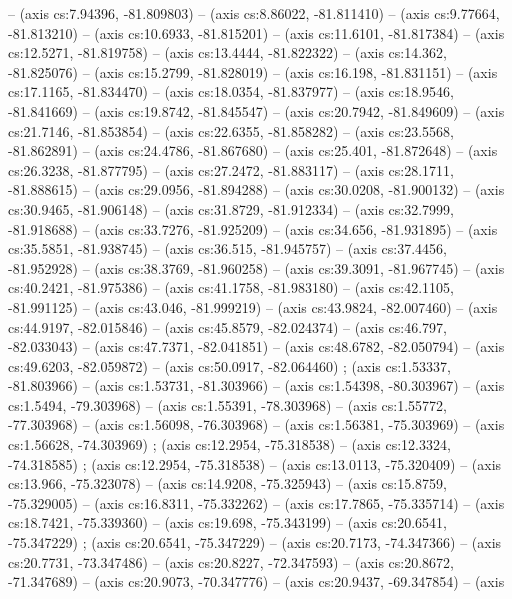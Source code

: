   -- (axis cs:7.94396, -81.809803) -- (axis cs:8.86022, -81.811410) -- (axis
  cs:9.77664, -81.813210) -- (axis cs:10.6933, -81.815201) -- (axis
  cs:11.6101, -81.817384) -- (axis cs:12.5271, -81.819758) -- (axis
  cs:13.4444, -81.822322) -- (axis cs:14.362, -81.825076) -- (axis cs:15.2799,
  -81.828019) -- (axis cs:16.198, -81.831151) -- (axis cs:17.1165, -81.834470)
  -- (axis cs:18.0354, -81.837977) -- (axis cs:18.9546, -81.841669) -- (axis
  cs:19.8742, -81.845547) -- (axis cs:20.7942, -81.849609) -- (axis
  cs:21.7146, -81.853854) -- (axis cs:22.6355, -81.858282) -- (axis
  cs:23.5568, -81.862891) -- (axis cs:24.4786, -81.867680) -- (axis cs:25.401,
  -81.872648) -- (axis cs:26.3238, -81.877795) -- (axis cs:27.2472,
  -81.883117) -- (axis cs:28.1711, -81.888615) -- (axis cs:29.0956,
  -81.894288) -- (axis cs:30.0208, -81.900132) -- (axis cs:30.9465,
  -81.906148) -- (axis cs:31.8729, -81.912334) -- (axis cs:32.7999,
  -81.918688) -- (axis cs:33.7276, -81.925209) -- (axis cs:34.656, -81.931895)
  -- (axis cs:35.5851, -81.938745) -- (axis cs:36.515, -81.945757) -- (axis
  cs:37.4456, -81.952928) -- (axis cs:38.3769, -81.960258) -- (axis
  cs:39.3091, -81.967745) -- (axis cs:40.2421, -81.975386) -- (axis
  cs:41.1758, -81.983180) -- (axis cs:42.1105, -81.991125) -- (axis cs:43.046,
  -81.999219) -- (axis cs:43.9824, -82.007460) -- (axis cs:44.9197,
  -82.015846) -- (axis cs:45.8579, -82.024374) -- (axis cs:46.797, -82.033043)
  -- (axis cs:47.7371, -82.041851) -- (axis cs:48.6782, -82.050794) -- (axis
  cs:49.6203, -82.059872) -- (axis cs:50.0917, -82.064460)
  ;  (axis cs:1.53337, -81.803966) -- (axis
  cs:1.53731, -81.303966) -- (axis cs:1.54398, -80.303967) -- (axis cs:1.5494,
  -79.303968) -- (axis cs:1.55391, -78.303968) -- (axis cs:1.55772,
  -77.303968) -- (axis cs:1.56098, -76.303968) -- (axis cs:1.56381,
  -75.303969) -- (axis cs:1.56628, -74.303969) ; 
  (axis cs:12.2954, -75.318538) -- (axis cs:12.3324, -74.318585)
  ;  (axis cs:12.2954, -75.318538) -- (axis
  cs:13.0113, -75.320409) -- (axis cs:13.966, -75.323078) -- (axis cs:14.9208,
  -75.325943) -- (axis cs:15.8759, -75.329005) -- (axis cs:16.8311,
  -75.332262) -- (axis cs:17.7865, -75.335714) -- (axis cs:18.7421,
  -75.339360) -- (axis cs:19.698, -75.343199) -- (axis cs:20.6541, -75.347229)
  ;  (axis cs:20.6541, -75.347229) -- (axis
  cs:20.7173, -74.347366) -- (axis cs:20.7731, -73.347486) -- (axis
  cs:20.8227, -72.347593) -- (axis cs:20.8672, -71.347689) -- (axis
  cs:20.9073, -70.347776) -- (axis cs:20.9437, -69.347854) -- (axis
